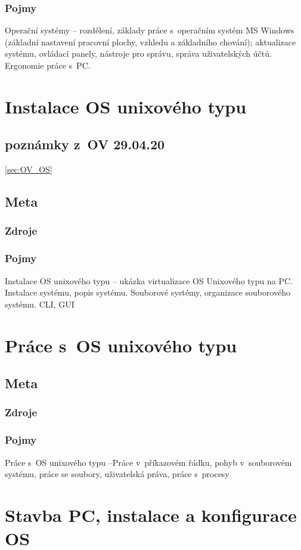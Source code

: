 \documentclass[12pt]{article}
\begin{document}
\subsubsection{Pojmy}
Operační systémy – rozdělení, základy práce s~operačním systém MS Windows (základní nastavení pracovní plochy, vzhledu a základního chování); aktualizace systému, ovládací panely, nástroje pro správu, správa
uživatelských účtů. Ergonomie práce s~PC.

\section{Instalace OS unixového typu}
\subsection{poznámky z~OV 29.04.20}
\ref{sec:OV_OS} 
\subsection{Meta}
\subsubsection{Zdroje}
\subsubsection{Pojmy}
Instalace OS unixového typu – ukázka virtualizace OS Unixového typu na PC. Instalace systému, popis systému. Souborové systémy, organizace souborového systému. CLI, GUI

\section{Práce s~OS unixového typu}
\subsection{Meta}
\subsubsection{Zdroje}
\subsubsection{Pojmy}
Práce s~OS unixového typu –Práce v~příkazovém řádku, pohyb v~souborovém systému, práce se soubory, uživatelská práva, práce s~procesy

\section{Stavba PC, instalace a konfigurace OS}
\end{document}
